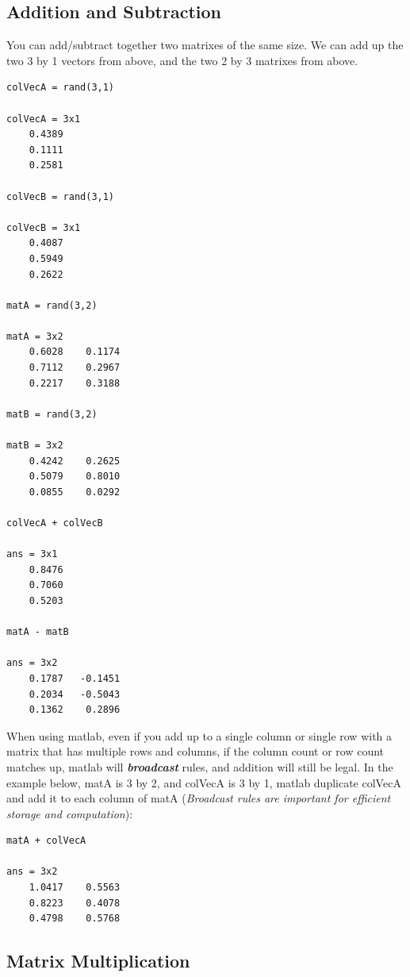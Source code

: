 \documentclass[
]{book}
\begin{document}
\hypertarget{addition-and-subtraction}{%
\subsection{Addition and Subtraction}\label{addition-and-subtraction}}

You can add/subtract together two matrixes of the same size. We can add
up the two 3 by 1 vectors from above, and the two 2 by 3 matrixes from
above.

\begin{verbatim}
colVecA = rand(3,1)

colVecA = 3x1    
    0.4389
    0.1111
    0.2581

colVecB = rand(3,1)

colVecB = 3x1    
    0.4087
    0.5949
    0.2622

matA = rand(3,2)

matA = 3x2    
    0.6028    0.1174
    0.7112    0.2967
    0.2217    0.3188

matB = rand(3,2)

matB = 3x2    
    0.4242    0.2625
    0.5079    0.8010
    0.0855    0.0292

colVecA + colVecB

ans = 3x1    
    0.8476
    0.7060
    0.5203

matA - matB

ans = 3x2    
    0.1787   -0.1451
    0.2034   -0.5043
    0.1362    0.2896
\end{verbatim}

When using matlab, even if you add up to a single column or single row
with a matrix that has multiple rows and columns, if the column count or
row count matches up, matlab will \textbf{\emph{broadcast}} rules, and addition
will still be legal. In the example below, matA is 3 by 2, and colVecA
is 3 by 1, matlab duplicate colVecA and add it to each column of matA
(\emph{Broadcast rules are important for efficient storage and computation}):

\begin{verbatim}
matA + colVecA

ans = 3x2    
    1.0417    0.5563
    0.8223    0.4078
    0.4798    0.5768
\end{verbatim}

\hypertarget{matrix-multiplication}{%
\subsection{\texorpdfstring{\textbf{Matrix Multiplication}}{Matrix Multiplication}}\label{matrix-multiplication}}
\end{document}
